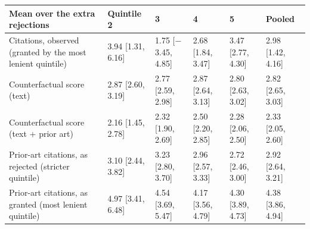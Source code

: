 \begin{tabular}{llllll}
\toprule
Mean over the extra rejections & Quintile 2 & 3 & 4 & 5 & Pooled \\
\midrule
Citations, observed (granted by the most lenient quintile) & 3.94 [1.31, 6.16] & 1.75 [$-$3.45, 4.85] & 2.68 [1.84, 3.47] & 3.47 [2.77, 4.30] & 2.98 [1.42, 4.16] \\
Counterfactual score (text) & 2.87 [2.60, 3.19] & 2.77 [2.59, 2.98] & 2.87 [2.64, 3.13] & 2.80 [2.63, 3.02] & 2.82 [2.65, 3.03] \\
Counterfactual score (text + prior art) & 2.16 [1.45, 2.78] & 2.32 [1.90, 2.69] & 2.50 [2.20, 2.85] & 2.28 [2.06, 2.50] & 2.33 [2.05, 2.60] \\
Prior-art citations, as rejected (stricter quintile) & 3.10 [2.44, 3.82] & 3.23 [2.80, 3.70] & 2.96 [2.57, 3.33] & 2.72 [2.46, 3.00] & 2.92 [2.64, 3.21] \\
Prior-art citations, as granted (most lenient quintile) & 4.97 [3.41, 6.48] & 4.54 [3.69, 5.47] & 4.17 [3.56, 4.79] & 4.30 [3.89, 4.73] & 4.38 [3.86, 4.94] \\
\bottomrule
\end{tabular}
